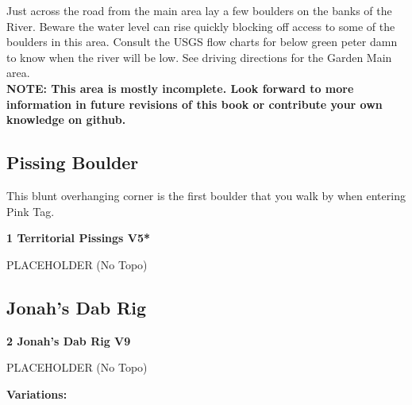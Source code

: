 \begin{multicols}{2}



Just across the road from the main area lay a few boulders on the banks of the River. Beware the water level can rise quickly blocking off access to some of the boulders in this area. Consult the USGS flow charts for below green peter damn to know when the river will be low. See driving directions for the Garden Main area.\\

\textbf{NOTE: This area is mostly incomplete. Look forward to more information in future revisions of this book or contribute your own knowledge on github.}\\


\newpage





\needspace{1.5cm}
\subsection*{Pissing Boulder}\label{bf:Pissing Boulder}
This blunt overhanging corner is the first boulder that you walk by when entering Pink Tag.\\
	


\needspace{1.5cm}
\label{rt:Territorial Pissings}
\colorbox{RoyalBlue!20}{
\parbox{0.95\linewidth}{
\textbf{
1 Territorial Pissings V5*  
}}}

\begin{adjustwidth}{0.5cm}{}			
PLACEHOLDER (No Topo)
\end{adjustwidth}




\needspace{1.5cm}
\subsection*{Jonah's Dab Rig}\label{bf:Jonah's Dab Rig}
	


\needspace{1.5cm}
\label{rt:Jonah's Dab Rig}
\colorbox{Goldenrod!50}{
\parbox{0.95\linewidth}{
\textbf{
2 Jonah's Dab Rig V9  
}}}

\begin{adjustwidth}{0.5cm}{}			
PLACEHOLDER (No Topo)
\end{adjustwidth}

\begin{adjustwidth}{0.5cm}{}				
\needspace{3cm}
\textbf{Variations:} \newline


\end{adjustwidth}
\end{multicols}

